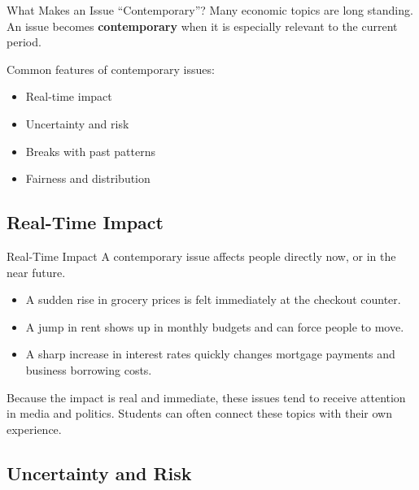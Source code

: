 \documentclass[aspectratio=169]{beamer}
\begin{document}
\begin{frame}{What Makes an Issue ``Contemporary''?}
  \transfade
  Many economic topics are long standing. An issue becomes \textbf{contemporary} when it is especially
  relevant to the current period.

  \vspace{0.3cm}
  Common features of contemporary issues:
  \begin{itemize}
    \item Real-time impact
    \item Uncertainty and risk
    \item Breaks with past patterns
    \item Fairness and distribution
  \end{itemize}
\end{frame}

\subsection{Real-Time Impact}

\begin{frame}{Real-Time Impact}
  \transfade
  A contemporary issue affects people directly now, or in the near future.

  \begin{itemize}
    \item A sudden rise in grocery prices is felt immediately at the checkout counter.
    \item A jump in rent shows up in monthly budgets and can force people to move.
    \item A sharp increase in interest rates quickly changes mortgage payments and business
    borrowing costs.
  \end{itemize}

  \vspace{0.3cm}
  Because the impact is real and immediate, these issues tend to receive attention in media
  and politics. Students can often connect these topics with their own experience.
\end{frame}

\subsection{Uncertainty and Risk}
\end{document}
